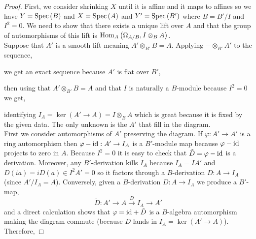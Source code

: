 \documentclass[12pt]{article}
\begin{document}
\begin{proof}
First, we consider shrinking $X$ until it is affine and it maps to affines so we have $Y = \mathrm{Spec}\left( B \right)$ and $X = \mathrm{Spec}\left( A \right)$ and $Y' = \mathrm{Spec}\left( B' \right)$ where $B = B'/I$ and $I^2 = 0$. We need to show that there exists a unique lift over $A$ and that the group of automorphisms of this lift is $\mathrm{Hom}_{A} \left( \Omega_{A/B}, I \otimes_{B} A \right)$. 
\bigskip\\
Suppose that $A'$ is a smooth lift meaning $A' \otimes_{B'} B = A$. Applying $- \otimes_{B'} A'$ to the sequence,
\begin{center}
\end{center}
we get an exact sequence because $A'$ is flat over $B'$,
\begin{center}
\end{center}
then using that $A' \otimes_{B'} B = A$ and that $I$ is naturally a $B$-module because $I^2 = 0$ we get,
\begin{center}
\end{center}
identifying $I_A = \ker{(A' \to A)} = I \otimes_B A$ which is great because it is fixed by the given data. The only unknown is the $A'$ that fill in the diagram. 
\bigskip\\
First we consider automorphisms of $A'$ preserving the diagram. If $\varphi : A' \to A'$ is a ring automorphism then $\varphi - \mathrm{id} : A' \to I_A$ is a $B'$-module map because $\varphi - \mathrm{id}$ projects to zero in $A$. Because $I^2 = 0$ it is easy to check that $\tilde{D} = \varphi - \mathrm{id}$ is a derivation. Moreover, any $B'$-derivation kills $I_A$ because $I_A = IA'$ and $D(i a) = i D(a) \in I^2 A' = 0$ so it factors through a $B$-derivation $D : A \to I_A$ (since $A'/I_A = A$). Conversely, given a $B$-derivation $D : A \to I_A$ we produce a $B'$-map,
\[ \tilde{D} : A' \to A \xrightarrow{D} I_A \to A' \]
and a direct calculation shows that $\varphi = \mathrm{id} + \tilde{D}$ is a $B$-algebra automorphism making the diagram commute (because $D$ lands in $I_A = \ker{(A' \to A)}$). Therefore,

\end{proof}
\end{document}
